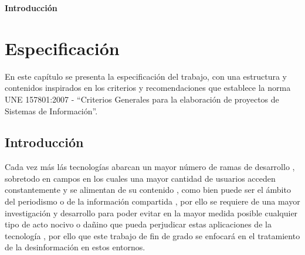 \begin{center}
{\Large \bfseries Introducción}
\vspace{2.5cm}
\end{center}
\section{Especificación}

En este capítulo se presenta la especificación del trabajo, con una estructura y
contenidos inspirados en los criterios y recomendaciones que establece la norma
UNE 157801:2007 - “Criterios Generales para la elaboración de proyectos de
Sistemas de Información”.

\subsection{Introducción}

Cada vez más lás tecnologías abarcan un mayor número de ramas de desarrollo , sobretodo en campos en los cuales una mayor cantidad de usuarios acceden constantemente y se alimentan de su contenido , como bien puede ser el ámbito del periodismo o de la información compartida , por ello se requiere de una mayor investigación y desarrollo para poder evitar en la mayor medida posible cualquier tipo de acto nocivo o dañino que pueda perjudicar estas aplicaciones de la tecnología , por ello que este trabajo de fin de grado se enfocará en el tratamiento de la desinformación en estos entornos.